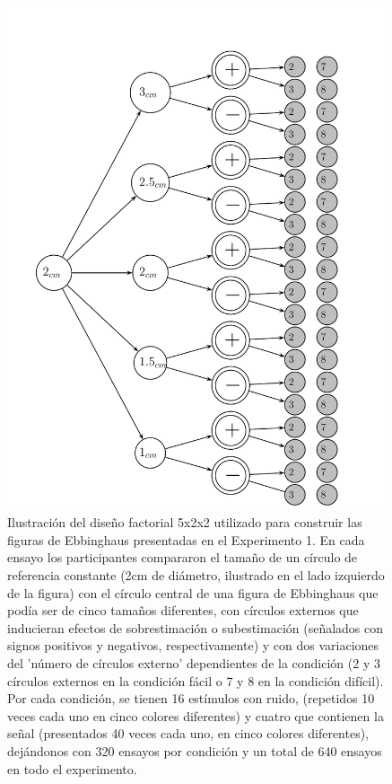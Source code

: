 \begin{itemize}
\begin{figure}[th]
\centering
\includegraphics[width=0.99\textwidth]{Figures/Estimulos_Experimento1} 
\decoRule
\caption[Diseño de Estímulos en el Experimento 1]{Ilustración del diseño factorial 5x2x2 utilizado para construir las figuras de Ebbinghaus presentadas en el Experimento 1. En cada ensayo los participantes compararon el tamaño de un círculo de referencia constante (2cm de diámetro, ilustrado en el lado izquierdo de la figura) con el círculo central de una figura de Ebbinghaus que podía ser de cinco tamaños diferentes, con círculos externos que inducieran efectos de sobrestimación o subestimación (señalados con signos positivos y negativos, respectivamente) y con dos variaciones del 'número de círculos externo' dependientes de la condición (2 y 3 círculos externos en la condición fácil o 7 y 8 en la condición difícil). Por cada condición, se tienen 16 estímulos con ruido, (repetidos 10 veces cada uno en cinco colores diferentes) y cuatro que contienen la señal (presentados 40 veces cada uno, en cinco colores diferentes), dejándonos con 320 ensayos por condición y un total de 640 ensayos en todo el experimento.}
\label{fig:Exp_1}
\end{figure}


\end{itemize}
